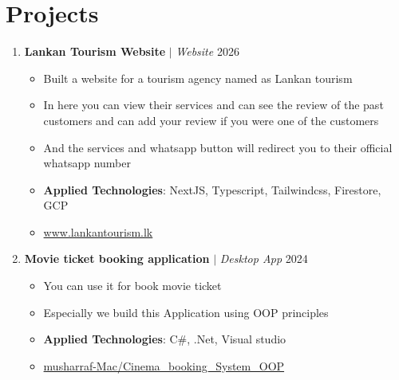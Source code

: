 \documentclass[10pt,a4paper]{article}
\newcommand{\project}[3]{%
  \textbf{#1} $|$ \textit{#2} \hfill #3}
\begin{document}
\section{Projects}

\begin{enumerate}
  \item \project{Lankan Tourism Website}{Website}{2026}
   \begin{itemize}
    \item Built a website for a tourism agency named as Lankan tourism
    \item In here you can view their services and can see the review of the past customers and can add your review if you were one of the customers
    \item And the services and whatsapp button will redirect you to their official whatsapp number
    \item \textbf{Applied Technologies}: NextJS, Typescript, Tailwindcss, Firestore, GCP
    \item \faLink \href{https://lankantourism.lk}{ www.lankantourism.lk}
   \end{itemize}

  \item \project{Movie ticket booking application}{Desktop App}{2024}
   \begin{itemize}
    \item You can use it for book movie ticket
    \item Especially we build this Application using OOP principles 
    \item \textbf{Applied Technologies}: C\#, .Net, Visual studio 
    \item \faGithub \href{https://github.com/musharraf-Mac/Cinema_booking_System_OOP}{ musharraf-Mac/Cinema\_booking\_System\_OOP}
   \end{itemize}


\end{enumerate}
\end{document}
